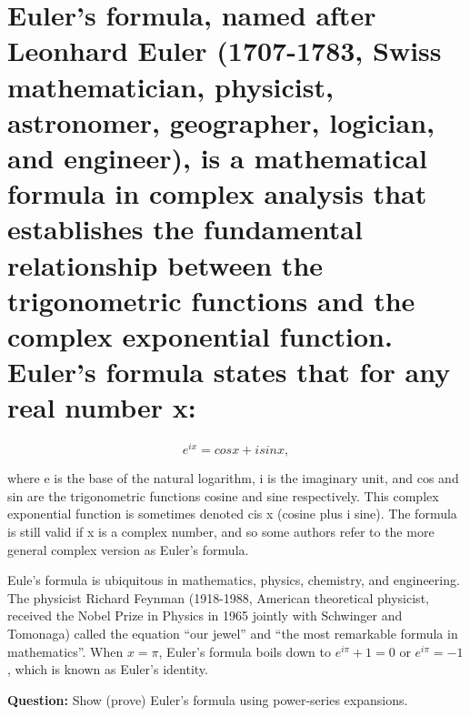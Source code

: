 \documentclass{article}
\begin{document}
\section{Euler's formula, named after Leonhard Euler (1707-1783, Swiss mathematician, physicist, astronomer, geographer, logician, and engineer), is a mathematical formula in complex analysis that establishes the fundamental relationship between the trigonometric functions and the complex exponential function. Euler's formula states that for any real number x:}

\begin{equation*}
  e^{ix} = cos x + i sin x,
\end{equation*}

where e is the base of the natural logarithm, i is the imaginary unit, and cos and sin are the trigonometric functions cosine and sine respectively. This complex exponential function is sometimes denoted cis x (cosine plus i sine). The formula is still valid if x is a complex number, and so some authors refer to the more general complex version as Euler's formula.

Eule's formula is ubiquitous in mathematics, physics, chemistry, and engineering. The physicist Richard Feynman (1918-1988, American theoretical physicist, received the Nobel Prize in Physics in 1965 jointly with Schwinger and Tomonaga) called the equation “our jewel” and “the most remarkable formula in mathematics”. When $x = \pi$, Euler's formula boils down to $e^{i\pi} + 1 = 0$ or $e^{i\pi} = -1$, which is known as Euler's identity.

\begin{tcolorbox}
  \textbf{Question:} Show (prove) Euler’s formula using power-series expansions.
\end{tcolorbox}
\end{document}
